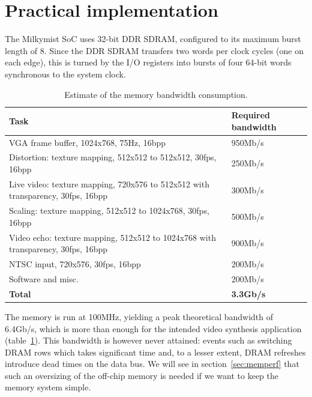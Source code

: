 \documentclass[a4paper,11pt]{kthesis}
\begin{document}
\section{Practical implementation}
\label{sec:memimpl}
The Milkymist SoC uses 32-bit DDR SDRAM, configured to its maximum burst length of 8. Since the DDR SDRAM transfers two words per clock cycles (one on each edge), this is turned by the I/O registers into bursts of four 64-bit words synchronous to the system clock.

\begin{table}
\centering
\begin{tabularx}{13cm}{|X|l|}
\hline
\textbf{Task} & \textbf{Required bandwidth} \\
\hline
VGA frame buffer, 1024x768, 75Hz, 16bpp & 950Mb/s \\
\hline
Distortion: texture mapping, 512x512 to 512x512, 30fps, 16bpp & 250Mb/s \\
\hline
Live video: texture mapping, 720x576 to 512x512 with transparency, 30fps, 16bpp & 300Mb/s \\
\hline
Scaling: texture mapping, 512x512 to 1024x768, 30fps, 16bpp & 500Mb/s \\
\hline
Video echo: texture mapping, 512x512 to 1024x768 with transparency, 30fps, 16bpp & 900Mb/s \\
\hline
NTSC input, 720x576, 30fps, 16bpp & 200Mb/s \\
\hline
Software and misc. & 200Mb/s \\
\hline
\textbf{Total} & \textbf{3.3Gb/s} \\
\hline
\end{tabularx}
\caption{Estimate of the memory bandwidth consumption.}\label{tab:membw}
\end{table}

The memory is run at 100MHz, yielding a peak theoretical bandwidth of 6.4Gb/s, which is more than enough for the intended video synthesis application (table~\ref{tab:membw}). This bandwidth is however never attained: events such as switching DRAM rows which takes significant time and, to a lesser extent, DRAM refreshes introduce dead times on the data bus. We will see in section~\ref{sec:memperf} that such an oversizing of the off-chip memory is needed if we want to keep the memory system simple.
\end{document}
